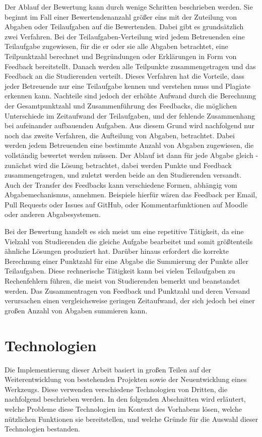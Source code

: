 Der Ablauf der Bewertung kann durch wenige Schritten beschrieben werden.
Sie beginnt im Fall einer Bewertendenanzahl größer eins mit der Zuteilung von Abgaben oder Teilaufgaben auf die Bewertenden.
Dabei gibt es grundsätzlich zwei Verfahren.
Bei der Teilaufgaben-Verteilung wird jedem Betreuenden eine Teilaufgabe zugewiesen, für die er oder sie alle Abgaben betrachtet, eine Teilpunktzahl berechnet und Begründungen oder Erklärungen in Form von Feedback bereitstellt.
Danach werden alle Teilpunkte zusammengetragen und das Feedback an die Studierenden verteilt.
Dieses Verfahren hat die Vorteile, dass jeder Betreuende nur eine Teilaufgabe kennen und verstehen muss und Plagiate erkennen kann.
Nachteile sind jedoch der erhöhte Aufwand durch die Berechnung der Gesamtpunktzahl und Zusammenführung des Feedbacks, die möglichen Unterschiede im Zeitaufwand der Teilaufgaben, und der fehlende Zusammenhang bei aufeinander aufbauenden Aufgaben.
Aus diesem Grund wird nachfolgend nur noch das zweite Verfahren, die Aufteilung von Abgaben, betrachtet.
Dabei werden jedem Betreuenden eine bestimmte Anzahl von Abgaben zugewiesen, die vollständig bewertet werden müssen.
Der Ablauf ist dann für jede Abgabe gleich - zunächst wird die Lösung betrachtet, dabei werden Punkte und Feedback zusammengetragen, und zuletzt werden beide an den Studierenden versandt.
Auch der Transfer des Feedbacks kann verschiedene Formen, abhängig vom Abgabemechanismus, annehmen.
Beispiele hierfür wären das Feedback per Email, Pull Requests oder Issues auf GitHub, oder Kommentarfunktionen auf Moodle oder anderen Abgabesystemen.

Bei der Bewertung handelt es sich meist um eine repetitive Tätigkeit, da eine Vielzahl von Studierenden die gleiche Aufgabe bearbeitet und somit größtenteils ähnliche Lösungen produziert hat.
Darüber hinaus erfordert die korrekte Berechnung einer Punktzahl für eine Abgabe die Summierung der Punkte aller Teilaufgaben.
Diese rechnerische Tätigkeit kann bei vielen Teilaufgaben zu Rechenfehlern führen, die meist von Studierenden bemerkt und beanstandet werden.
Das Zusammentragen von Feedback und Punktzahl und deren Versand verursachen einen vergleichsweise geringen Zeitaufwand, der sich jedoch bei einer großen Anzahl von Abgaben summieren kann.

\section{Technologien}\label{sec:tech}

Die Implementierung dieser Arbeit basiert in großen Teilen auf der Weiterentwicklung von bestehenden Projekten sowie der Neuentwicklung eines Werkzeugs.
Diese verwenden verschiedene Technologien von Dritten, die nachfolgend beschrieben werden.
In den folgenden Abschnitten wird erläutert, welche Probleme diese Technologien im Kontext des Vorhabens lösen, welche nützlichen Funktionen sie bereitstellen, und welche Gründe für die Auswahl dieser Technologien bestanden.

